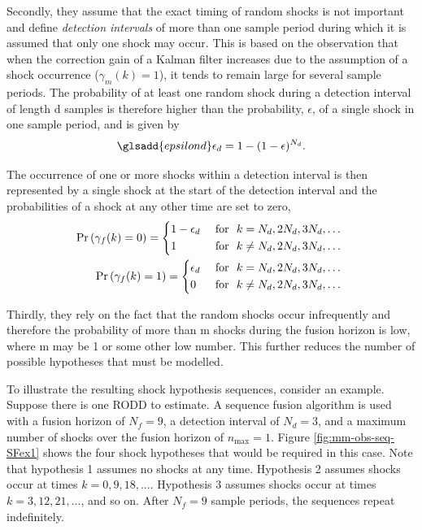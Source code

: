 Secondly, they assume that the exact timing of random shocks is not important and define \textit{detection intervals} of more than one sample period during which it is assumed that only one shock may occur. This is based on the observation that when the correction gain of a Kalman filter increases due to the assumption of a shock occurrence ($\gamma_m(k)=1$), it tends to remain large for several sample periods. The probability of at least one random shock during a detection interval of length \gls{d} samples is therefore higher than the probability, $\epsilon$, of a single shock in one sample period, and is given by
\begin{equation}  \label{eq:p_gamma_d}
	\glsadd{epsilond}\epsilon_d = 1 - (1 - \epsilon)^{N_d}.
\end{equation}

The occurrence of one or more shocks within a detection interval is then represented by a single shock at the start of the detection interval and the probabilities of a shock at any other time are set to zero,
\begin{equation} \label{eq:Pr_gamma_nd}
	\begin{aligned}
		\Pr\left(\gamma_{f}(k)=0\right) = \begin{cases*}
			1 - \epsilon_d & \text { for } $k = N_d, 2N_d, 3N_d, \ldots$ \\
			1 & \text { for } $k \ne N_d, 2N_d, 3N_d, \ldots$
		\end{cases*} \\
		\Pr\left(\gamma_{f}(k)=1\right) = \begin{cases*}
			\epsilon_d & \text { for } $k = N_d, 2N_d, 3N_d, \ldots$ \\
			0 & \text { for } $k \ne N_d, 2N_d, 3N_d, \ldots$
		\end{cases*} \\
	\end{aligned}
\end{equation}

Thirdly, they rely on the fact that the random shocks occur infrequently and therefore the probability of more than \gls{m} shocks during the fusion horizon is low, where \gls{m} may be 1 or some other low number. This further reduces the number of possible hypotheses that must be modelled.

To illustrate the resulting shock hypothesis sequences, consider an example. Suppose there is one \gls{RODD} to estimate. A sequence fusion algorithm is used with a fusion horizon of $N_f=9$, a detection interval of $N_d=3$, and a maximum number of shocks over the fusion horizon of $n_\text{max}=1$. Figure \ref{fig:mm-obs-seq-SFex1} shows the four shock hypotheses that would be required in this case. Note that hypothesis 1 assumes no shocks at any time. Hypothesis 2 assumes shocks occur at times $k=0,9,18,...$. Hypothesis 3 assumes shocks occur at times $k=3,12,21,...$, and so on. After $N_f=9$ sample periods, the sequences repeat indefinitely.

